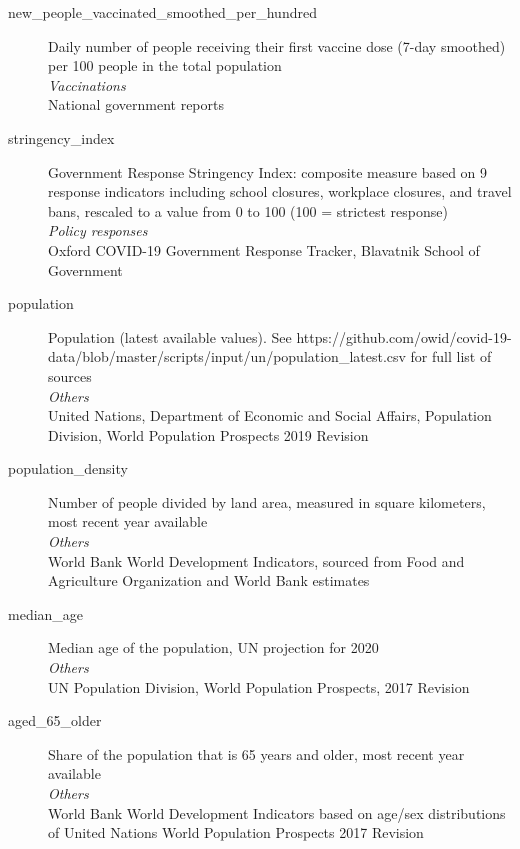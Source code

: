 \begin{description}
    \item[new\_people\_vaccinated\_smoothed\_per\_hundred] 
    Daily number of people receiving their first vaccine dose (7-day smoothed) per 100 people in the total population\\
    \emph{\footnotesize{Vaccinations}}\\
    \footnotesize{National government reports}\\

    \item[stringency\_index] 
    Government Response Stringency Index: composite measure based on 9 response indicators including school closures, workplace closures, and travel bans, rescaled to a value from 0 to 100 (100 = strictest response)\\
    \emph{\footnotesize{Policy responses}}\\
    \footnotesize{Oxford COVID-19 Government Response Tracker, Blavatnik School of Government}\\

    \item[population] 
    Population (latest available values). See https://github.com/owid/covid-19-data/blob/master/scripts/input/un/population\_latest.csv for full list of sources\\
    \emph{\footnotesize{Others}}\\
    \footnotesize{United Nations, Department of Economic and Social Affairs, Population Division, World Population Prospects 2019 Revision}\\

    \item[population\_density] 
    Number of people divided by land area, measured in square kilometers, most recent year available\\
    \emph{\footnotesize{Others}}\\
    \footnotesize{World Bank World Development Indicators, sourced from Food and Agriculture Organization and World Bank estimates}\\

    \item[median\_age] 
    Median age of the population, UN projection for 2020\\
    \emph{\footnotesize{Others}}\\
    \footnotesize{UN Population Division, World Population Prospects, 2017 Revision}\\

    \item[aged\_65\_older] 
    Share of the population that is 65 years and older, most recent year available\\
    \emph{\footnotesize{Others}}\\
    \footnotesize{World Bank World Development Indicators based on age/sex distributions of United Nations World Population Prospects 2017 Revision}\\


\end{description}
